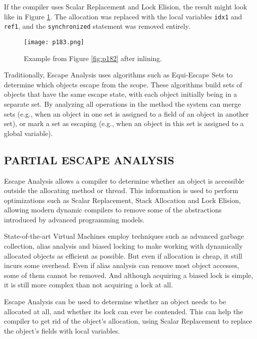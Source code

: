 If the compiler uses Scalar Replacement and Lock Elision,
the result might look like in Figure \ref{fig:p183}.
The allocation was
replaced with the local variables \texttt{idx1} and
\texttt{ref1}, and the
\texttt{synchronized} statement was removed entirely.

\begin{figure}[H]
	\centering
	\texttt{[image: p183.png]}
	\caption{ Example from Figure \ref{fig:p182} after inlining.}
	\label{fig:p183}
\end{figure}

Traditionally, Escape Analysis uses algorithms such as
Equi-Escape Sets \cite{kotzmann2005escape} to determine which objects escape from
the scope. These algorithms build sets of objects that have
the same escape state, with each object initially being in a
separate set. By analyzing all operations in the method the
system can merge sets (e.g., when an object in one set is assigned to a field of an object in another set), or mark a
set as escaping (e.g., when an object in this set is assigned
to a global variable).

\subsection{PARTIAL ESCAPE ANALYSIS}


Escape Analysis allows a compiler to determine whether an
object is accessible outside the allocating method or thread.
This information is used to perform optimizations such as
Scalar Replacement, Stack Allocation and Lock Elision, allowing modern dynamic compilers to remove some of the
abstractions introduced by advanced programming models.







State-of-the-art Virtual Machines employ techniques such
as advanced garbage collection, alias analysis and biased
locking to make working with dynamically allocated objects
as efficient as possible. But even if allocation is cheap, it
still incurs some overhead. Even if alias analysis can remove
most object accesses, some of them cannot be removed. And
although acquiring a biased lock is simple, it is still more
complex than not acquiring a lock at all.

Escape Analysis can be used to determine whether an object needs to be allocated at all, and whether its lock can
ever be contended. This can help the compiler to get rid of
the object’s allocation, using Scalar Replacement to replace
the object’s fields with local variables.

